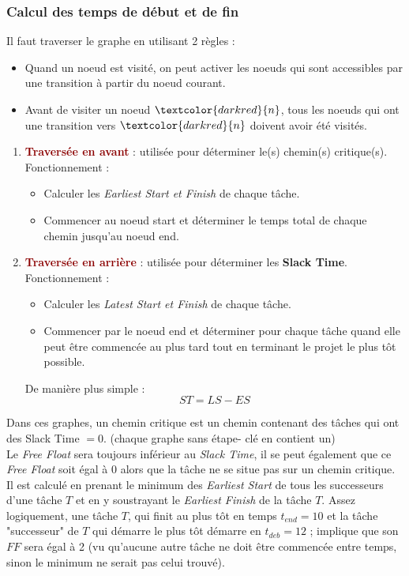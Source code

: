 \documentclass{article}
\newcommand{\rouge}[1]{\textcolor{darkred}{#1}}
\begin{document}
\begin{sffamily}
\subsubsection{Calcul des temps de début et de fin}

Il faut traverser le graphe en utilisant 2 règles :
\begin{itemize}
\item Quand un noeud est visité, on peut activer les noeuds qui sont accessibles par une transition à partir du noeud courant.
\item Avant de visiter un noeud $\rouge{n}$, tous les noeuds qui ont une transition vers $\rouge{n}$ doivent avoir été visités.
\end{itemize}

\begin{enumerate}
\item \rouge{\textbf{Traversée en avant}} : utilisée pour déterminer le(s) chemin(s) critique(s). Fonctionnement :
\begin{itemize}
\item Calculer les \textit{Earliest Start et Finish} de chaque tâche.
\item Commencer au noeud start et déterminer le temps total de chaque chemin jusqu'au noeud end.
\end{itemize}
\item \rouge{\textbf{Traversée en arrière}} : utilisée pour déterminer les \textbf{Slack Time}. Fonctionnement :
\begin{itemize}
\item Calculer les \textit{Latest Start et Finish} de chaque tâche.
\item Commencer par le noeud end et déterminer pour chaque tâche quand elle peut être commencée au plus tard tout en terminant 
le projet le plus tôt possible.
\end{itemize}
De manière plus simple : $$\boxed{ST = LS-ES}$$
\end{enumerate}

Dans ces graphes, un chemin critique est un chemin contenant des tâches qui ont des Slack Time $=0$. (chaque graphe sans étape-
clé en contient un) \\

Le \textit{Free Float} sera toujours inférieur au \textit{Slack Time}, il se peut également que ce \textit{Free Float} soit égal 
à 0 alors que la tâche ne se situe pas sur un chemin critique. Il est calculé en prenant le minimum des \textit{Earliest Start} 
de tous les successeurs d'une tâche $T$ et en y soustrayant le \textit{Earliest Finish} de la tâche $T$. Assez logiquement, une 
tâche $T$, qui finit au plus tôt en temps $t_{end} = 10$ et la tâche "successeur" de $T$ qui démarre le plus tôt démarre en 
$t_{deb} = 12$ ; implique que son $FF$ sera égal à 2 (vu qu'aucune autre tâche ne doit être commencée entre temps, sinon le 
minimum ne serait pas celui trouvé).\\


\end{sffamily}
\end{document}
